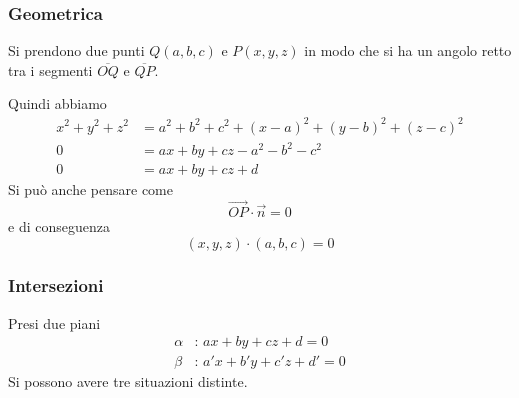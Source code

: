 \subsubsection{Geometrica}
Si prendono due punti $Q(a,b,c)$ e $P(x,y,z)$ in modo che si ha un angolo retto tra i segmenti
$\overline{OQ}$ e $\overline{QP}$.
\begin{center}
\end{center}
Quindi abbiamo
\begin{align*}
  x^2+y^2+z^2&=a^2+b^2+c^2+(x-a)^2+(y-b)^2+(z-c)^2\\
  0&=ax+by+cz-a^2-b^2-c^2\\
  0&=ax+by+cz+d
\end{align*}
Si può anche pensare come
\begin{equation*}
  \vec{OP}\cdot\vec{n}=0
\end{equation*}
e di conseguenza
\begin{equation*}
  (x,y,z)\cdot(a,b,c)=0
\end{equation*}

\subsubsection{Intersezioni}
Presi due piani
\begin{align*}
  \alpha&:\,ax+by+cz+d=0\\
  \beta&:\,a'x+b'y+c'z+d'=0
\end{align*}
Si possono avere tre situazioni distinte.
